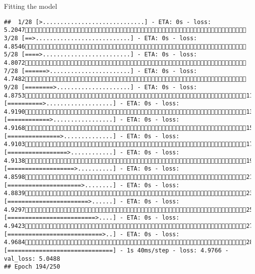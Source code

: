 \documentclass[
  ignorenonframetext,
]{beamer}
\begin{document}
\begin{frame}[fragile]{Fitting the model}
\begin{verbatim}
##  1/28 [>.............................] - ETA: 0s - loss: 5.2047 3/28 [==>...........................] - ETA: 0s - loss: 4.8546 5/28 [====>.........................] - ETA: 0s - loss: 4.8072 7/28 [======>.......................] - ETA: 0s - loss: 4.7482 9/28 [========>.....................] - ETA: 0s - loss: 4.875311/28 [==========>...................] - ETA: 0s - loss: 4.919013/28 [============>.................] - ETA: 0s - loss: 4.916815/28 [===============>..............] - ETA: 0s - loss: 4.910317/28 [=================>............] - ETA: 0s - loss: 4.913819/28 [===================>..........] - ETA: 0s - loss: 4.859821/28 [=====================>........] - ETA: 0s - loss: 4.883923/28 [=======================>......] - ETA: 0s - loss: 4.929725/28 [=========================>....] - ETA: 0s - loss: 4.942327/28 [===========================>..] - ETA: 0s - loss: 4.968428/28 [==============================] - 1s 40ms/step - loss: 4.9766 - val_loss: 5.0488
## Epoch 194/250

\end{verbatim}
\end{frame}
\end{document}
